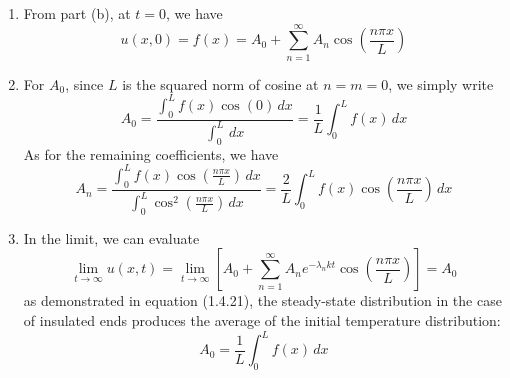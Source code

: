 \documentclass[a4paper]{article}
\begin{document}
\begin{enumerate}[label=(\alph*)]
	Lastly, when \( \lambda > 0 \), we have
	\[
		\phi \!\left( x \right) = c_{1}\cos\!\left(\sqrt{\lambda}x\right) + c_{2}\sin\!\left(\sqrt{\lambda}x\right) 
	\]
	which has spatial derivative
	\[
		\frac{\partial \phi}{\partial x} = -c_{1}\sqrt{\lambda}\sin\!\left(\sqrt{\lambda}x\right) + c_{2}\sqrt{\lambda}\cos\!\left(\sqrt{\lambda}x\right) 
	\]
	Imposing the boundary conditions yield
	\[
		\frac{\partial \phi}{\partial x}\!\left( 0 \right) = c_{2}\sqrt{\lambda} = 0 \implies c_{2} = 0, \qquad \frac{\partial \phi}{\partial x}\!\left( L \right) = -c_{1}\sqrt{\lambda}\sin\!\left(\sqrt{\lambda}L\right) = 0
	\]
	where in the second boundary condition, if we hold \( c_{1} \neq 0 \), a non-trivial solution emerges if we set 
	\[
		\lambda_{n} = \!\left( \frac{n \pi}{L} \right)^{2} 
	\]
	where \( n \) is any positive integer. Since the solution holds for any cosine mode \( n \), appealing to superposition, we can write our complete solution by combining the separated functions into a linear combination:
	\[
		u \!\left( x,t \right) = A_{0} + \sum^{\infty}_{n=1} A_{n}e^{-\lambda_{n}kt}\cos\!\left(\frac{n \pi x}{L}\right) 
	\]
	where \( A_{0} \) is our constant solution from the zero eigenvalue case, \( \lambda_{n} \) our indexed eigenvalue, and \( A_{n} \) arbitrary constants determined by the initial condition \( f \!\left( x \right) \).
	\item From part (b), at \( t = 0 \), we have
	\[
		u \!\left( x,0 \right) = f \!\left( x \right) = A_{0} + \sum^{\infty}_{n=1} A_{n}\cos\!\left(\frac{n \pi x}{L}\right) 
	\]
	\item For \( A_{0} \), since \( L \) is the squared norm of cosine at \( n = m = 0 \), we simply write
	\[
		A_{0} = \frac{\int^{L}_{0} f \!\left( x \right)\cos\!\left(0\right) \, dx}{\int^{L}_{0} \, dx} = \frac{1}{L}\int^{L}_{0} f \!\left( x \right) \, dx  
	\]
	As for the remaining coefficients, we have
	\[
		A_{n} = \frac{\int^{L}_{0} f \!\left( x \right)\cos\!\left(\frac{n \pi x}{L}\right) \, dx}{\int^{L}_{0} \cos^{2}\!\left(\frac{n \pi x}{L}\right) \, dx} = \frac{2}{L}\int^{L}_{0} f \!\left( x \right)\cos\!\left(\frac{n \pi x}{L}\right) \, dx  
	\]
	\item In the limit, we can evaluate
	\[
		\lim\limits_{t \to \infty}u \!\left( x,t \right) = \lim\limits_{t \to \infty}\!\left[ A_{0} + \sum^{\infty}_{n=1} A_{n}e^{-\lambda_{n}kt}\cos\!\left(\frac{n \pi x}{L}\right) \right] = A_{0}
	\]
	as demonstrated in equation (1.4.21), the steady-state distribution in the case of insulated ends produces the average of the initial temperature distribution:
	\[
		A_{0} = \frac{1}{L}\int^{L}_{0} f \!\left( x \right) \, dx  
	\]
\end{enumerate}
\end{document}
